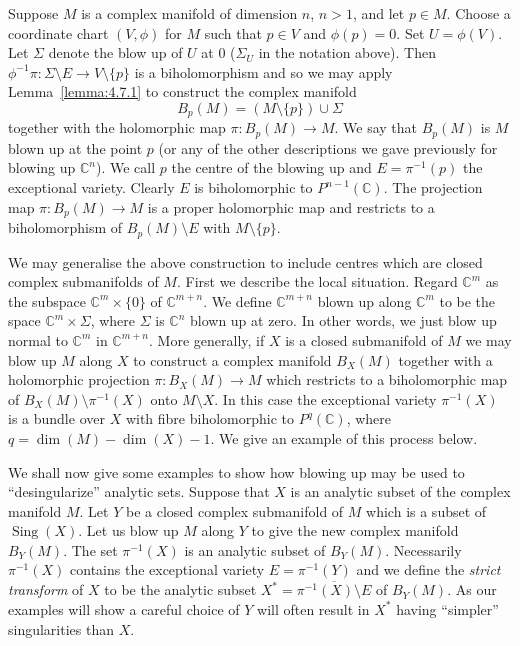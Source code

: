 Suppose $M$ is a complex manifold of dimension $n$, $n>1$, and let $p\in M$. Choose a coordinate chart $(V,\phi)$ for $M$ such that $p\in V$ and $\phi(p)=0$. Set $U=\phi(V)$. Let $\Sigma$ denote the blow up of $U$ at 0 ($\Sigma_U$ in the notation above). Then $\phi^{-1}\pi:\Sigma\setminus E\longrightarrow V\setminus\{p\}$ is a biholomorphism and so we may apply Lemma~\ref{lemma:4.7.1} to construct the complex manifold
\[
B_p(M)=(M\setminus\{p\})\cup\Sigma
\]
together with the holomorphic map $\pi:B_p(M)\longrightarrow M$. We say that $B_p(M)$ is $M$ blown up at the point $p$ (or any of the other descriptions we gave previously for blowing up $\mathbb C^n$). We call $p$ the centre of the blowing up and $E=\pi^{-1}(p)$ the exceptional variety. Clearly $E$ is biholomorphic to $P^{n-1}(\mathbb C)$. The projection map $\pi:B_p(M)\longrightarrow M$ is a proper holomorphic map and restricts to a biholomorphism of $B_p(M)\setminus E$ with $M\setminus\{p\}$.

We may generalise the above construction to include centres which are closed complex submanifolds of $M$. First we describe the local situation. Regard $\mathbb C^m$ as the subspace $\mathbb C^m\times\{0\}$ of $\mathbb C^{m+n}$. We define $\mathbb C^{m+n}$ blown up along $\mathbb C^m$ to be the space $\mathbb C^m\times\Sigma$, where $\Sigma$ is $\mathbb C^n$ blown up at zero. In other words, we just blow up normal to $\mathbb C^m$ in $\mathbb C^{m+n}$. More generally, if $X$ is a closed submanifold of $M$ we may blow up $M$ along $X$ to construct a complex manifold $B_X(M)$ together with a holomorphic projection $\pi:B_X(M)\longrightarrow M$ which restricts to a biholomorphic map of $B_X(M)\setminus\pi^{-1}(X)$ onto $M\setminus X$. In this case the exceptional variety $\pi^{-1}(X)$ is a bundle over $X$ with fibre biholomorphic to $P^q(\mathbb C)$, where $q=\dim(M)-\dim(X)-1$. We give an example of this process below.

We shall now give some examples to show how blowing up may be used to ``desingularize'' analytic sets. Suppose that $X$ is an analytic subset of
the complex manifold $M$. Let $Y$ be a closed complex submanifold of $M$ which is a subset of $\operatorname{Sing}(X)$. Let us blow up $M$ along $Y$ to give the new complex manifold $B_Y(M)$. The set $\pi^{-1}(X)$ is an analytic subset of $B_Y(M)$. Necessarily $\pi^{-1}(X)$ contains the exceptional variety $E=\pi^{-1}(Y)$ and we define the \emph{strict transform} of $X$ to be the analytic subset $X^*=\overline{\pi^{-1}(X)\setminus E}$ of $B_Y(M)$. As our examples will show a careful choice of $Y$ will often result in $X^*$ having ``simpler'' singularities than $X$.

